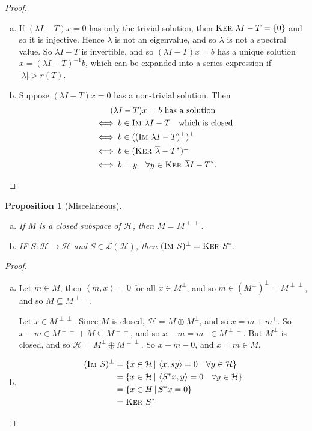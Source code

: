 \documentclass[10pt, oneside, reqno]{amsart}
\theoremstyle{plain}%
\newtheorem{prop}[thm]{Proposition}
\theoremstyle{definition}
\theoremstyle{remark}
\newcommand{\given}{ \, | \,}
\newcommand{\iprod}[1]{\left\langle #1 \right\rangle}
\newcommand{\im}{\textsc{Im\ }}
\renewcommand{\ker}{\textsc{Ker\ }}
\begin{document}
\begin{proof}
	{\ } \begin{enumerate}[(a)]
		\item If $(\lambda I - T) x = 0$ has only the trivial solution, then $\ker \lambda I - T = \{ 0 \}$ and so it is injective.  Hence $\lambda$ is not an eigenvalue, and so $\lambda$ is not a spectral value.  So $\lambda I - T$ is invertible, and so $(\lambda I - T) x = b$ has a unique solution $x = (\lambda I - T)^{-1} b$, which can be expanded into a series expression if $|\lambda| > r(T)$.  
		\item Suppose $(\lambda I - T) x = 0$ has a non-trivial solution.  Then
		\begin{align*}
			&\qquad\text{$(\lambda I - T) x = b$ has a solution} \\
			&\iff b \in \im \lambda I - T \quad \text{which is closed} \\
			&\iff b \in ((\im \lambda I - T)^\perp)^\perp \\
			&\iff b \in (\ker \overline \lambda - T^*)^\perp \\
			&\iff b \perp y \quad \forall y \in \ker \overline \lambda I - T^*.\qedhere
		\end{align*}
	\end{enumerate}
\end{proof}

\begin{prop}[Miscelaneous]{\ }\begin{enumerate}[(a)]
	\item If $M$ is a closed subspace of $\mathcal H$, then $M = M^{\perp \perp}$. 
	\item IF $S: \mathcal H \rightarrow \mathcal H$ and $S \in \mathcal L(\mathcal H)$, then $(\im S)^\perp = \ker S^*$.  
\end{enumerate}
\end{prop}

\begin{proof}{\ }
	\begin{enumerate}[(a)]
		\item Let $m \in M$, then $\iprod{m, x} = 0$ for all $x \in M^\perp$, and so $m \in (M^\perp)^\perp = M^{\perp \perp}$, and so $M \subseteq M^{\perp \perp}$.  
		
		Let $x \in M^{\perp \perp}$.  Since $M$ is closed, $\mathcal H = M \oplus M^{\perp}$, and so $x = m + m^\perp$.  So $x - m \in M^{\perp \perp} + M \subseteq M^{\perp \perp}$, and so $x - m = m^\perp \in M^{\perp \perp}$.  But $M^\perp$ is closed, and so $\mathcal H = M^\perp \oplus M^{\perp \perp}$.  So $x - m - 0$, and $x = m \in M$.  
		\item \begin{align*}
			(\im S)^\perp &= \{ x \in \mathcal H \given \iprod{x, sy} = 0 \quad \forall y \in \mathcal H \} \\
							&= \{ x \in \mathcal H \given \iprod{S^* x, y} = 0 \quad \forall y \in \mathcal H \} \\
							&= \{ x \in H \given S^* x = 0 \} \\
							&= \ker S^*
		\end{align*} 
	\end{enumerate}
\end{proof}
\end{document}
